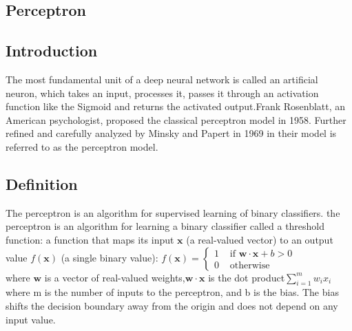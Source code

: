 \documentclass[12pt,times,a4paper]{report}
\begin{document}
{{\begin{normalsize}
\chapter{\fontsize{16}{14}\textbf{Perceptron\hfill}}

\section{Introduction}

\par
The most fundamental unit of a deep neural network is called an artificial neuron, which takes an input, processes it, passes it through an activation function like the Sigmoid and returns the activated output.Frank Rosenblatt, an American psychologist, proposed the classical perceptron model in 1958. Further refined and carefully analyzed by Minsky and Papert in 1969 in their model is referred to as the perceptron model.

\begin{figure}[H]
\begin{center}
\end{center}
\end{figure}

\section{Definition}
The perceptron is an algorithm for supervised learning of binary classifiers. the perceptron is an algorithm for learning a binary classifier called a threshold function: a function that maps its input $\mathbf {x}$  (a real-valued vector) to an output value $ f(\mathbf {x} )$ (a single binary value):
$f(\mathbf{x})=\left\{\begin{array}{ll}{1} & {\text { if } \mathbf{w} \cdot \mathbf{x}+b>0} \\ {0} & {\text { otherwise }}\end{array}\right.$\\
where $ \mathbf {w}$  is a vector of real-valued weights,$ {\displaystyle \mathbf {w} \cdot \mathbf {x} }$ is the dot product$ {\displaystyle \sum _{i=1}^{m}w_{i}x_{i}} $where m is the number of inputs to the perceptron, and b is the bias. The bias shifts the decision boundary away from the origin and does not depend on any input value.


\end{normalsize}}}
\end{document}

